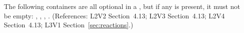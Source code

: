 The following containers are all optional in a \Reaction, but if any
is present, it must not be empty: ,
, , .
(References: L2V2 Section~4.13; L2V3 Section~4.13; L2V4 Section~4.13; L3V1 Section~\ref{sec:reactions}.)
